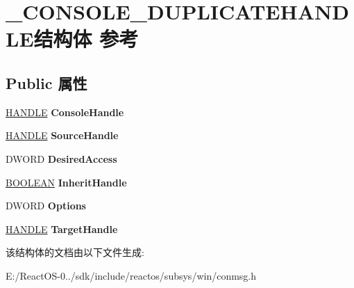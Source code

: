 \hypertarget{struct___c_o_n_s_o_l_e___d_u_p_l_i_c_a_t_e_h_a_n_d_l_e}{}\section{\+\_\+\+C\+O\+N\+S\+O\+L\+E\+\_\+\+D\+U\+P\+L\+I\+C\+A\+T\+E\+H\+A\+N\+D\+L\+E结构体 参考}
\label{struct___c_o_n_s_o_l_e___d_u_p_l_i_c_a_t_e_h_a_n_d_l_e}
\subsection*{Public 属性}
\begin{DoxyCompactItemize}
\item 
\mbox{\label{struct___c_o_n_s_o_l_e___d_u_p_l_i_c_a_t_e_h_a_n_d_l_e_ad553486d3eece91943314d0ba4933d5a}} 
\hyperlink{interfacevoid}{H\+A\+N\+D\+LE} {\bfseries Console\+Handle}
\item 
\mbox{\label{struct___c_o_n_s_o_l_e___d_u_p_l_i_c_a_t_e_h_a_n_d_l_e_a3abac50e59023a8d6b549be744b707f8}} 
\hyperlink{interfacevoid}{H\+A\+N\+D\+LE} {\bfseries Source\+Handle}
\item 
\mbox{\label{struct___c_o_n_s_o_l_e___d_u_p_l_i_c_a_t_e_h_a_n_d_l_e_a6d2a533622600d6dc44504e4a7464b24}} 
D\+W\+O\+RD {\bfseries Desired\+Access}
\item 
\mbox{\label{struct___c_o_n_s_o_l_e___d_u_p_l_i_c_a_t_e_h_a_n_d_l_e_ace5932d710bfdc8a3f6f92b3abd445b0}} 
\hyperlink{_processor_bind_8h_a112e3146cb38b6ee95e64d85842e380a}{B\+O\+O\+L\+E\+AN} {\bfseries Inherit\+Handle}
\item 
\mbox{\label{struct___c_o_n_s_o_l_e___d_u_p_l_i_c_a_t_e_h_a_n_d_l_e_ac041217a180473af0476d59727037c66}} 
D\+W\+O\+RD {\bfseries Options}
\item 
\mbox{\label{struct___c_o_n_s_o_l_e___d_u_p_l_i_c_a_t_e_h_a_n_d_l_e_a4559ec645146824bc6229265421bf0e0}} 
\hyperlink{interfacevoid}{H\+A\+N\+D\+LE} {\bfseries Target\+Handle}
\end{DoxyCompactItemize}


该结构体的文档由以下文件生成\+:\begin{DoxyCompactItemize}
\item 
E\+:/\+React\+O\+S-\/0../sdk/include/reactos/subsys/win/conmsg.\+h\end{DoxyCompactItemize}
